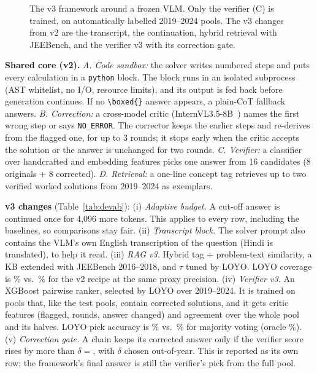 \documentclass[conference]{IEEEtran}
\begin{document}
\begin{figure}[t]
\caption{The v3 framework around a frozen VLM. Only the verifier (C) is trained, on
automatically labelled 2019--2024 pools. The v3 changes from v2 are the transcript, the
continuation, hybrid retrieval with JEEBench, and the verifier v3 with its correction gate.}
\label{fig:arch}
\end{figure}

\textbf{Shared core (v2).} \emph{A. Code sandbox:} the solver writes numbered steps and puts every
calculation in a \texttt{python} block. The block runs in an isolated subprocess (AST whitelist,
no I/O, resource limits), and its output is fed back before generation continues. If no
\verb|\boxed{}| answer appears, a plain-CoT fallback answers.
\emph{B. Correction:} a cross-model critic (InternVL3.5-8B~\cite{internvl35}) names the first
wrong step or says \texttt{NO\_ERROR}. The corrector keeps the earlier steps and re-derives from
the flagged one, for up to 3 rounds; it stops early when the critic accepts the solution or the
answer is unchanged for two rounds.
\emph{C. Verifier:} a classifier over handcrafted and embedding features picks one answer from 16
candidates (8 originals + 8 corrected).
\emph{D. Retrieval:} a one-line concept tag retrieves up to two verified worked solutions from
2019--2024 as exemplars.

\textbf{v3 changes} (Table~\ref{tab:devab}):
(i) \emph{Adaptive budget.} A cut-off answer is continued once for 4{,}096 more tokens. This
applies to every row, including the baselines, so comparisons stay fair.
(ii) \emph{Transcript block.} The solver prompt also contains the VLM's own English
transcription of the question (Hindi is translated), to help it read.
(iii) \emph{RAG v3.} Hybrid tag + problem-text similarity, a KB extended with JEEBench
2016--2018, and $\tau$ tuned by LOYO. LOYO coverage is \RagCovThree\% vs.\ \RagCovTwo\% for the
v2 recipe at the same proxy precision.
(iv) \emph{Verifier v3.} An XGBoost pairwise ranker, selected by LOYO over 2019--2024. It is
trained on pools that, like the test pools, contain corrected solutions, and it gets critic
features (flagged, rounds, answer changed) and agreement over the whole pool and its halves. LOYO
pick accuracy is \VerLoyo\% vs.\ \VerLoyoMaj\% for majority voting (oracle \VerLoyoOracle\%).
(v) \emph{Correction gate.} A chain keeps its corrected answer only if the verifier score rises
by more than $\delta{=}$\GateDelta{}, with $\delta$ chosen out-of-year. This is reported as its
own row; the framework's final answer is still the verifier's pick from the full pool.
\end{document}
